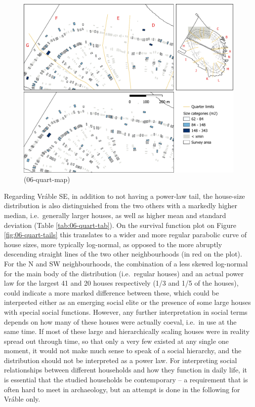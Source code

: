\documentclass[
  12pt,
  a4paper, twoside]{book}
\begin{document}
\begin{figure}

{\centering \includegraphics[width=0.9\linewidth]{Results/fig06_quart_map} 

}

\caption[Settlement plan of Nebelivka, power laws by quarter (details)]{(06-quart-map)}\label{fig:06-quart-map}
\end{figure}

Regarding Vráble SE, in addition to not having a power-law tail, the house-size distribution is also distinguished from the two others with a markedly higher median, i.e.~generally larger houses, as well as higher mean and standard deviation (Table \ref{tab:06-quart-tab}). On the survival function plot on Figure \ref{fig:06-quart-tails} this translates to a wider and more regular parabolic curve of house sizes, more typically log-normal, as opposed to the more abruptly descending straight lines of the two other neighbourhoods (in red on the plot). For the N and SW neighbourhoods, the combination of a less skewed log-normal for the main body of the distribution (i.e.~regular houses) and an actual power law for the largest 41 and 20 houses respectively (1/3 and 1/5 of the houses), could indicate a more marked difference between these, which could be interpreted either as an emerging social elite or the presence of some large houses with special social functions. However, any further interpretation in social terms depends on how many of these houses were actually coeval, i.e.~in use at the same time. If most of these large and hierarchically scaling houses were in reality spread out through time, so that only a very few existed at any single one moment, it would not make much sense to speak of a social hierarchy, and the distribution should not be interpreted as a power law. For interpreting social relationships between different households and how they function in daily life, it is essential that the studied households be contemporary -- a requirement that is often hard to meet in archaeology, but an attempt is done in the following for Vráble only.
\end{document}
